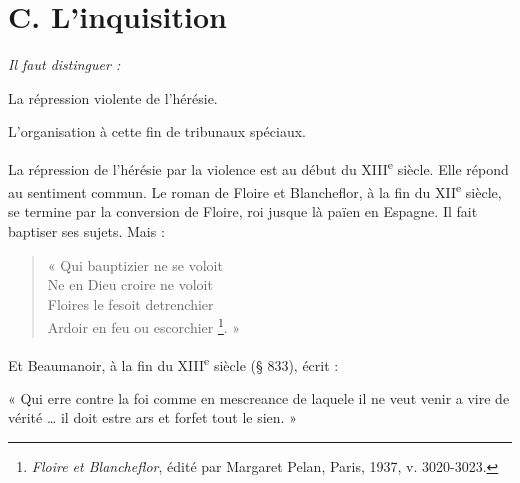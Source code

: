 \documentclass[french,twoside]{book} %
\newlength{\listmod}
\newcommand{\listhead}[1]{\hspace{-1\listmod}\emph{#1}}
\newcommand{\labelchar}[1]{{\color{rubric}\bf #1}}
\newenvironment{quoteblock}%
  {\begin{quoting}}
  {\end{quoting}}
\newenvironment{quotebar}{%
    \def\FrameCommand{{\color{rubric!10!}\vrule width 0.5em} \hspace{0.9em}}%
    \def\OuterFrameSep{\itemsep} %
    \MakeFramed {\advance\hsize-\width \FrameRestore}
  }%
  {%
    \endMakeFramed
  }
\renewenvironment{quoteblock}%
  {%
    \savenotes
    \setstretch{0.9}
    \begin{quotebar}
  }
  {%
    \end{quotebar}
    \spewnotes
  }
\begin{document}
\section[C. L’inquisition]{C. L’inquisition}
\label{c10c}

\begin{listalpha}[itemsep=0pt,]
\item[]\listhead{Il faut distinguer :}
\item La répression violente de l’hérésie.
\item L’organisation à cette fin de tribunaux spéciaux.

\end{listalpha}\noindent \labelchar{a)} La répression de l’hérésie par la violence est au début du XIII\textsuperscript{e} siècle. Elle répond au sentiment commun. Le roman de Floire et Blancheflor, à la fin du XII\textsuperscript{e} siècle, se termine par la conversion de Floire, roi jusque là païen en Espagne. Il fait baptiser ses sujets. Mais :\par


\begin{verse}
« Qui bauptizier ne se voloit\\
Ne en Dieu croire ne voloit\\
Floires le fesoit detrenchier\\
Ardoir en feu ou escorchier \footnote{{\itshape Floire et Blancheflor}, édité par Margaret Pelan, Paris, 1937, v. 3020-3023.}. »\\
\end{verse}

\noindent Et Beaumanoir, à la fin du XIII\textsuperscript{e} siècle (§ 833), écrit :\par

\begin{quoteblock}
\noindent « Qui erre contre la foi comme en mescreance de laquele il ne veut venir a vire de vérité … il doit estre ars et forfet tout le sien. »\end{quoteblock}
\end{document}
